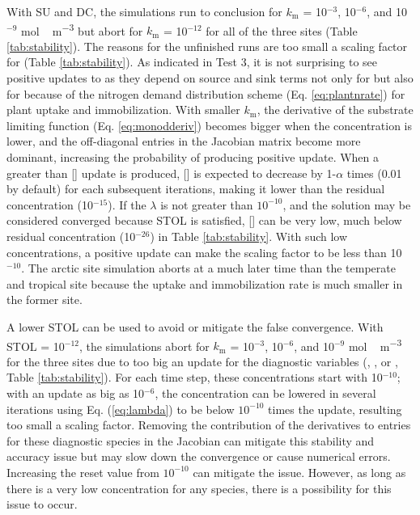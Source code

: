\documentclass[gmd, manuscript]{copernicus}
\begin{document}
With SU and DC, the simulations run to conclusion for $k_\text{m}$ = 10$^{-3}$,
10$^{-6}$, and 10$^{-9}$ \unit{mol\,m^{-3}} but abort for $k_\text{m}$ =
10$^{-12}$ for all of the three sites (Table \ref{tab:stability}). The reasons
for the unfinished runs are too small a scaling factor for  (Table
\ref{tab:stability}). As indicated in Test 3, it is not surprising
to see positive updates to  as they depend on source and
sink terms not only for  but also for  because of the
nitrogen demand distribution scheme (Eq. \ref{eq:plantnrate}) for plant uptake
and immobilization. With smaller $k_\text{m}$, the derivative of the substrate
limiting function (Eq. \ref{eq:monodderiv}) becomes bigger when
the concentration is lower, and the off-diagonal entries in the Jacobian matrix
become more dominant, increasing the probability of producing positive update.
When a greater than [] update is produced, [] is
expected to decrease by 1-$\alpha$ times (0.01 by default) for each subsequent
iterations, making it lower than the residual concentration (10$^{-15}$). If
the $\lambda$ is not greater than $10^{-10}$, and the solution may be
considered converged because STOL is satisfied, [] can be very low,
much below residual concentration (10$^{-26}$) in Table \ref{tab:stability}.
With such low concentrations, a positive update can  make the scaling factor to
be less than 10$^{-10}$. The arctic site simulation aborts at a much later time than the
temperate and tropical site because the uptake and immobilization rate is much smaller
 in the former site.

A lower STOL can be used to avoid or mitigate the false convergence. With STOL
= 10$^{-12}$, the simulations abort for $k_\text{m}$ = 10$^{-3}$, 10$^{-6}$,
and 10$^{-9}$ \unit{mol\,m^{-3}} for the three sites due to too big an update
for the diagnostic variables (, , or ,
Table \ref{tab:stability}). For each time step, these concentrations start with
10$^{-10}$; with an update as big as 10$^{-6}$, the concentration can be
lowered in several iterations using Eq. (\ref{eq:lambda}) to be below
$10^{-10}$ times the update, resulting too small a scaling factor. Removing the
contribution of the derivatives to entries for these diagnostic species in the
Jacobian can mitigate this stability and accuracy issue but may slow down the
convergence or cause numerical errors. Increasing the reset value from
$10^{-10}$ can mitigate the issue. However, as long as there is a very low
concentration for any species, there is a possibility for this issue to occur.  
\end{document}
